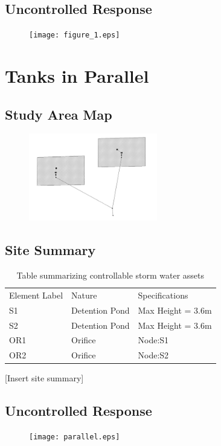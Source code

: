 \documentclass{article}
\begin{document}
\subsection{Uncontrolled Response}
\begin{figure}[H]
  \centering
  \texttt{[image: figure\_1.eps]}
\end{figure}


\section{Tanks in Parallel}

\subsection{Study Area Map}

\begin{figure}[H]
  \centering
  \includegraphics[width = 0.5\textwidth]{parallel.JPG}
\end{figure}

\subsection{Site Summary}
\begin{table}[H]
\centering
\label{my-label}
\begin{tabular}{lll}
Element Label & Nature         & Specifications   \\
S1            & Detention Pond & Max Height = 3.6m  \\
  S2            & Detention Pond & Max Height = 3.6m  \\
  OR1 & Orifice & Node:S1\\
  OR2 & Orifice & Node:S2
\end{tabular}
\caption{Table summarizing controllable storm water assets}
\end{table}
[Insert site summary]
\subsection{Uncontrolled Response}
\begin{figure}[H]
  \centering
  \texttt{[image: parallel.eps]}
\end{figure}
\end{document}
